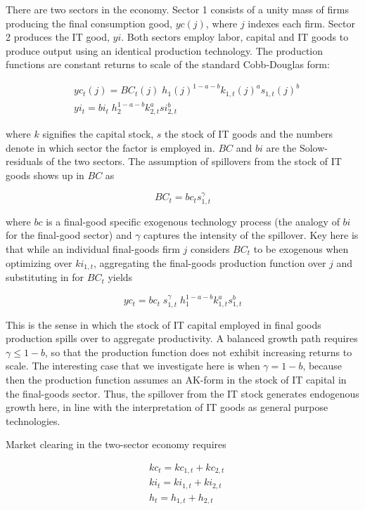 \documentclass[11pt]{article}
\renewcommand{\[}{\begin{equation}}
\renewcommand{\]}{\end{equation}}
\begin{document}
There are two sectors in the economy. Sector 1 consists of a unity mass of firms producing the final consumption good, $yc(j)$, where $j$ indexes each firm. Sector 2 produces the IT good, $yi$. Both sectors employ labor, capital and IT goods to produce output using an identical production technology. The production functions are constant returns to scale of the standard Cobb-Douglas form:

\begin{align}
& yc_t(j) = BC_t(j) \; h_1(j)^{1-a-b} k_{1,t}(j)^a s_{1,t}(j)^b \\
 & yi_t = bi_t  \; h_2^{1-a-b} k_{2,t}^a si_{2,t}^b 
\end{align}

where $k$ signifies the capital stock, $s$ the stock of IT goods and the numbers denote in which sector the factor is employed in. $BC$ and $bi$ are the Solow-residuals of the two sectors. The assumption of spillovers from the stock of IT goods shows up in $BC$ as 

\begin{equation}
BC_t  = bc_t  s_{1,t}^\gamma
\end{equation}

where $bc$ is a final-good specific exogenous technology process (the analogy of $bi$ for the final-good sector) and $\gamma$ captures the intensity of the spillover. Key here is that while an individual final-goods firm $j$ considers $BC_t$ to be exogenous when optimizing over $ki_{1,t}$, aggregating the final-goods production function over $j$ and substituting in for $BC_t$ yields

\begin{equation}
yc_t = bc_t \; s_{1,t}^\gamma \; h_1^{1-a-b} k_{1,t}^a s_{1,t}^b 
\end{equation}

This is the sense in which the stock of IT capital employed in final goods production spills over to aggregate productivity. A balanced growth path requires $\gamma \leq 1-b$, so that the production function does not exhibit increasing returns to scale. The interesting case that we investigate here is when $\gamma = 1-b$, because then the production function assumes an AK-form in the stock of IT capital in the final-goods sector. Thus, the spillover from the IT stock generates endogenous growth here, in line with the interpretation of IT goods as general purpose technologies.   

Market clearing in the two-sector economy requires

\begin{align}
& kc_t  = kc_{1,t} + kc_{2,t} \\
& ki_t = ki_{1,t} + ki_{2,t} \\
& h_t  = h_{1,t} + h_{2,t} 
\end{align}
\end{document}
